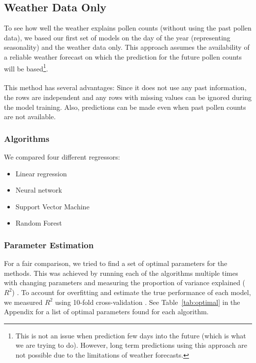 \documentclass[a4paper,11pt]{article}
\begin{document}
\subsection{Weather Data Only}
To see how well the weather explains pollen counts (without using the past pollen data), we based our first set of models on the day of the year (representing seasonality) and the weather data only. This approach assumes the availability of a reliable weather forecast on which the prediction for the future pollen counts will be based\footnote{This is not an issue when prediction few days into the future (which is what we are trying to do). However, long term predictions using this approach are not possible due to the limitations of weather forecasts.}.\\\\
This method has several advantages: Since it does not use any past information, the rows are independent and any rows with missing values can be ignored during the model training. Also, predictions can be made even when past pollen counts are not available.

\subsubsection*{Algorithms}
We compared four different regressors:
\begin{itemize}
	\item Linear regression \cite{seber2012linear}
	\item Neural network \cite{haykin2004comprehensive}
	\item Support Vector Machine \cite{suykens1999least}
	\item Random Forest \cite{liaw2002classification}
\end{itemize}
\subsubsection*{Parameter Estimation} For a fair comparison, we tried to find a set of optimal parameters for the methods. This was achieved by running each of the algorithms multiple times with changing parameters and measuring the proportion of variance explained ($R^2$) \cite{carpenter1960principles}. To account for overfitting and estimate the true performance of each model, we measured $R^2$ using 10-fold cross-validation \cite{kohavi1995study}.
See Table~\ref{tab:optimal} in the Appendix for a list of optimal parameters found for each algorithm.
\end{document}
